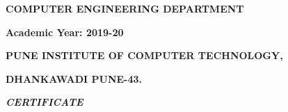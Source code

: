 \documentclass[12pt]{article}
\renewcommand{\_}{\kern-1.5pt\textunderscore\kern-1.5pt}
\begin{document}

\tab \par

 \par

 \par

 \par

\begin{Center}
{\fontsize{20pt}{24.0pt}\selectfont \textbf{COMPUTER ENGINEERING DEPARTMENT}\par}
\end{Center}\par

\begin{Center}
{\fontsize{20pt}{24.0pt}\selectfont \textbf{Academic Year: 2019-20}\par}


\newpage

\end{Center}\par


\vspace{\baselineskip}
\begin{Center}
{\fontsize{20pt}{24.0pt}\selectfont \textbf{ }\par}
\end{Center}\par

\begin{Center}
{\fontsize{14pt}{16.8pt}\selectfont \textbf{PUNE INSTITUTE OF COMPUTER TECHNOLOGY,}\par}
\end{Center}\par

\begin{Center}
{\fontsize{14pt}{16.8pt}\selectfont \textbf{DHANKAWADI PUNE-43.}\par}
\end{Center}\par


\vspace{\baselineskip}
\begin{Center}
{\fontsize{26pt}{31.2pt}\selectfont \textbf{\textit{CERTIFICATE}}{\fontsize{14pt}{16.8pt}\selectfont  \par}\par}
\end{Center}\par
\end{document}
